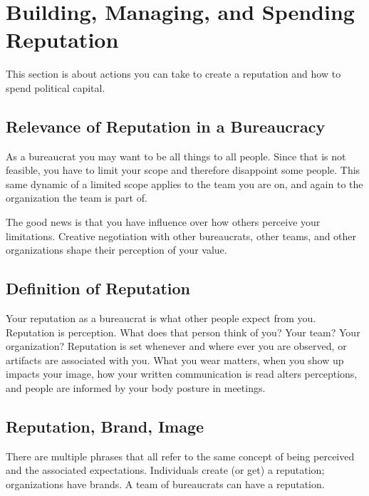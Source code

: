 \section{Building, Managing, and Spending Reputation\label{sec:reputation}}




This section is about actions you can take to create a reputation and how to spend political capital. 

\subsection*{Relevance of Reputation in a Bureaucracy}

As a bureaucrat you may want to be all things to all people. Since that is not feasible, you have to limit your scope and therefore disappoint some people. This same dynamic of a limited scope applies to the team you are on, and again to the organization the team is part of.

The good news is that you have influence over how others perceive your limitations. Creative negotiation with other bureaucrats, other teams, and other organizations shape their perception of your value. 

\subsection*{Definition of Reputation}

Your reputation as a bureaucrat is what other people expect from you. Reputation is perception. What does that person think of you? Your team? Your organization? 
Reputation is set whenever and where ever you are observed, or artifacts are associated with you. 
What you wear matters, when you show up impacts your image, how your written communication is read alters perceptions, and people are informed by your body posture in meetings. 

\subsection*{Reputation, Brand, Image}

There are multiple phrases that all refer to the same concept of being perceived and the associated expectations. Individuals create (or get) a reputation; organizations have brands. A team of bureaucrats can have a reputation. 

